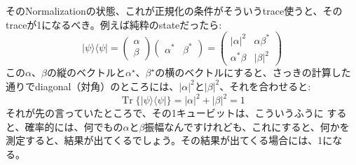 そのNormalizationの状態、これが正規化の条件がそういうtrace使うと、そのtraceが1になるべき。例えば純粋のstateだったら:
\begin{equation}
|\psi\rangle\langle\psi|=\left(\begin{array}{l}
\alpha \\
\beta
\end{array}\right)\left(\begin{array}{ll}
\alpha^{*} & \beta^{*}
\end{array}\right)=\left(\begin{array}{ll}
|\alpha|^{2} & \alpha \beta^{*} \\
\alpha^{*} \beta & |\beta|^{2}
\end{array}\right)
\end{equation}
この$\alpha$、$\beta$の縦のベクトルと$\alpha^{\star}$、$\beta^{\star}$の横のベクトルにすると、さっきの計算した通りでdiagonal（対角）のところには、$|\alpha|^2$と$|\beta|^2$、それを合わせると:
\begin{equation}
\operatorname{Tr}\{|\psi\rangle\langle\psi|\}=|\alpha|^{2}+|\beta|^{2}=1
\end{equation}
それが先の言っていたところで、その1キュービットは、こういうふうに
すると、確率的には、何でもの$\alpha$と$\beta$振幅なんですけれども、これにすると、何かを測定すると、結果が出てくるでしょう。その結果が出てくる場合には、1になる。
